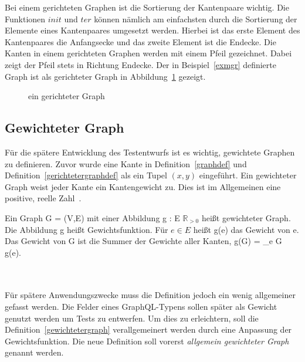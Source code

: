 Bei einem gerichteten Graphen ist die Sortierung der Kantenpaare wichtig.
Die Funktionen $init$ und $ter$ können nämlich am einfachsten durch die Sortierung der Elemente eines Kantenpaares umgesetzt werden.
Hierbei ist das erste Element des Kantenpaares die Anfangsecke und das zweite Element ist die Endecke.
Die Kanten in einem gerichteten Graphen werden mit einem Pfeil gezeichnet.
Dabei zeigt der Pfeil stets in Richtung Endecke.
Der in Beispiel~\ref{exmgr} definierte Graph ist als gerichteter Graph in Abbildung~\ref{graphexample} gezeigt.

\begin{figure}[H]
    \begin{center}
    \end{center}
    \caption{ein gerichteter Graph}
    \label{graphexample}
\end{figure}

\subsection{Gewichteter Graph}

Für die spätere Entwicklung des Testentwurfs ist es wichtig, gewichtete Graphen zu definieren.
Zuvor wurde eine Kante in Definition~\ref{graphdef} und Definition~\ref{gerichtetergraphdef} als ein Tupel $(x, y)$ eingeführt.
Ein gewichteter Graph weist jeder Kante ein Kantengewicht zu.
Dies ist im Allgemeinen eine positive, reelle Zahl~\cite[vgl. S. 251]{graphentheorie3}.

\begin{definition}
    Ein Graph G = (V,E) mit einer Abbildung g : E \textrightarrow $\mathbb{R}_{>0}$ heißt gewichteter Graph.
    Die Abbildung g heißt Gewichtsfunktion. Für $e \in E$ heißt g(e) das Gewicht von e.
    Das Gewicht von G ist die Summer der Gewichte aller Kanten, g(G) = \sum_{e \in G} g(e).\\
    \cite[vgl.~Definition~6.1~S.~251]{graphentheorie3}
    \label{gewichtetergraph}
\end{definition}
\\
\\
Für spätere Anwendungszwecke muss die Definition jedoch ein wenig allgemeiner gefasst werden.
Die Felder eines GraphQL-Typens sollen später als Gewicht genutzt werden um Tests zu entwerfen.
Um dies zu erleichtern, soll die Definition~\ref{gewichtetergraph} verallgemeinert werden durch eine Anpassung der Gewichtsfunktion.
Die neue Definition soll vorerst \textit{allgemein gewichteter Graph} genannt werden.

